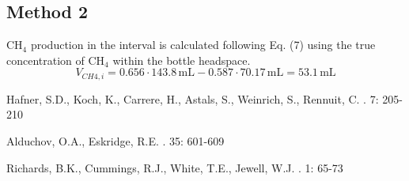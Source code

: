 \documentclass[]{article}
\newcommand{\unit}[1]{\ensuremath{\, \mathrm{#1}}}
\begin{document}
\subsection{Method 2}
CH$_4$  production in the interval is calculated following Eq. (7) using the true concentration of CH$_4$ within the bottle headspace.
\begin{equation*}
    V_{CH{4},i} = 0.656 \cdot 143.8\unit{mL} - 0.587 \cdot 70.17\unit{mL} = 53.1\unit{mL} 
\end{equation*}

\begin{thebibliography}{1}

Hafner, S.D., Koch, K., Carrere, H., Astals, S., Weinrich, S., Rennuit, C.
    . 
     7: 205-210

Alduchov, O.A., Eskridge, R.E.    
    . 
     35: 601-609

Richards, B.K., Cummings, R.J., White, T.E., Jewell, W.J.    
    . 
     1: 65-73

\end{thebibliography}


%
\end{document}
